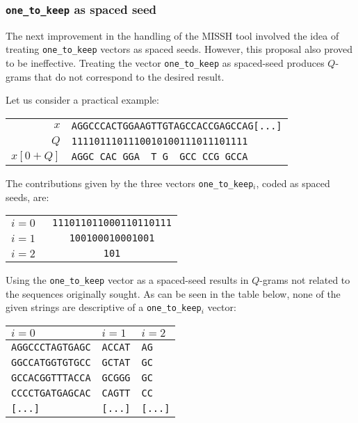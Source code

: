 \subsubsection*{\texttt{one\_to\_keep} as spaced seed}
The next improvement in the handling of the \acs{MISSH} tool involved the idea of treating \verb|one_to_keep| vectors as spaced seeds. However, this proposal also proved to be ineffective. Treating the vector \verb|one_to_keep| as spaced-seed produces $Q$-grams that do not correspond to the desired result.

\begin{example}
	Let us consider a practical example:
	\begin{center}
		\begin{tabular}{r || l}
			$x$ & \texttt{AGGCCCACTGGAAGTTGTAGCCACCGAGCCAG[...]} \\
			$Q$ & \texttt{1111011101110010100111011101111} \\
			$x[0 + Q]$ & \texttt{AGGC\ CAC\ GGA\ \ T\ G\ \ GCC\ CCG\ GCCA} \\
		\end{tabular}
	\end{center}

	The contributions given by the three vectors \verb|one_to_keep|$_i$, coded as spaced seeds, are:
	\begin{center}
		\begin{tabular}{l || l}
			$i = 0$ & \verb| 111011011000110110111| \\
			$i = 1$ & \verb|    100100010001001   | \\
			$i = 2$ & \verb|          101         | \\
		\end{tabular}
	\end{center}

	Using the \verb|one_to_keep| vector as a spaced-seed results in $Q$-grams not related to the sequences originally sought. As can be seen in the table below, none of the given strings are descriptive of a \verb|one_to_keep|$_i$ vector:
	\begin{center}
		\begin{tabular}{l | l | l}	
			$i = 0$ & $i = 1$ & $i = 2$ \\
			\toprule
			\verb|AGGCCCTAGTGAGC| & \verb|ACCAT| & \verb|AG| \\
			\verb|GGCCATGGTGTGCC| & \verb|GCTAT| & \verb|GC| \\
			\verb|GCCACGGTTTACCA| & \verb|GCGGG| & \verb|GC| \\
			\verb|CCCCTGATGAGCAC| & \verb|CAGTT| & \verb|CC| \\
			\verb|[...]| & \verb|[...]| & \verb|[...]| \\
		\end{tabular}
	\end{center}


\end{example}

